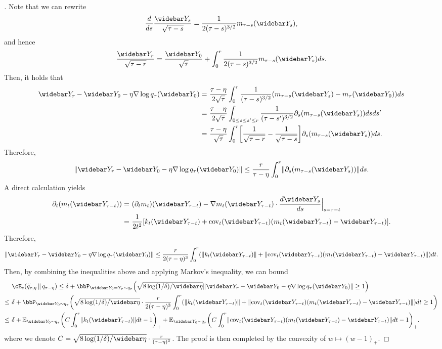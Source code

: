 \begin{proof}[]
Note that we can rewrite
\begin{align*}
    \frac{d}{ds} \frac{\Ybar_s}{\sqrt{\tau-s}}=\frac1{2(\tau-s)^{3/2}}m_{\tau-s}(\Ybar_s),
\end{align*}
and hence
\begin{align*}
    \frac{\Ybar_{r}}{\sqrt{\tau-r}}=\frac{\Ybar_0}{\sqrt{\tau}}+\int_0^r \frac1{2(\tau-s)^{3/2}}m_{\tau-s}(\Ybar_s)ds.
\end{align*}
Then, it holds that
\begin{align*}
    \Ybar_r-\Ybar_0-\eta \nabla \log q_\tau(\Ybar_0)
    =&~\frac{\tau-\eta}{2\sqrt{\tau}}\int_0^r \frac1{(\tau-s)^{3/2}}(m_{\tau-s}(\Ybar_s)-m_\tau(\Ybar_0))ds \\
    =&~\frac{\tau-\eta}{2\sqrt{\tau}}\int_{0\leq s\leq s'\leq r} \frac1{(\tau-s')^{3/2}}\partial_s (m_{\tau-s}(\Ybar_s))dsds' \\
    =&~\frac{\tau-\eta}{\sqrt{\tau}}\int_{0}^r \brk*{\frac{1}{\sqrt{\tau-r}}-\frac{1}{\sqrt{\tau-s}}} \partial_s (m_{\tau-s}(\Ybar_s))ds.
\end{align*}
Therefore,
\begin{align*}
    \nrm{\Ybar_r-\Ybar_0-\eta \nabla \log q_\tau(\Ybar_0)}
    \leq \frac{r}{\tau-\eta}\int_0^r \nrm{\partial_s (m_{\tau-s}(\Ybar_s))} ds.
\end{align*}
A direct calculation yields
\begin{align*}
    \partial_t (m_t(\Ybar_{\tau-t}))
    =&~(\partial_t m_t)(\Ybar_{\tau-t})-\nabla m_t(\Ybar_{\tau-t})\cdot \frac{d\Ybar_s}{ds}\Big|_{s=\tau-t} \\
    =&~ \frac{1}{2t^2}\brk*{ k_t(\Ybar_{\tau-t})+\cov_t(\Ybar_{\tau-t})(m_t(\Ybar_{\tau-t})-\Ybar_{\tau-t}) }.
\end{align*}
Therefore,
\begin{align*}
    \nrm{\Ybar_r-\Ybar_0-\eta \nabla \log q_\tau(\Ybar_0)}
    \leq \frac{r}{2(\tau-\eta)^3}\int_0^r (\nrm{k_t(\Ybar_{\tau-t})}+\nrm{\cov_t(\Ybar_{\tau-t})(m_t(\Ybar_{\tau-t})-\Ybar_{\tau-t})}) dt.
\end{align*}
Then, by combining the inequalities above and applying Markov's inequality, we can bound
\begin{align*}
    &~\Dcov[e]{\wt{q}_{\tau,\eta}}{q_{\tau-\eta}}
    \leq \delta+ \bbP_{\Ybar_0=Y_\tau\sim q_\tau}\prn*{ \sqrt{8\log(1/\delta)/\etabar}\nrm{ \Ybar_r-\Ybar_0-\eta \nabla \log q_\tau(\Ybar_0) }\geq 1 } \\
    \leq&~ \delta+ \bbP_{\Ybar_0\sim q_\tau}\prn*{ \sqrt{8\log(1/\delta)/\etabar}\cdot \frac{r}{2(\tau-\eta)^3}\int_0^r (\nrm{k_t(\Ybar_{\tau-t})}+\nrm{\cov_t(\Ybar_{\tau-t})(m_t(\Ybar_{\tau-t})-\Ybar_{\tau-t})}) dt \geq 1 } \\
    \leq&~ \delta+\En_{\Ybar_0\sim q_\tau}\prn*{C \int_0^r \nrm{k_t(\Ybar_{\tau-t})}dt-1 }_++\En_{\Ybar_0\sim q_\tau}\prn*{C \int_0^r \nrm{\cov_t(\Ybar_{\tau-t})(m_t(\Ybar_{\tau-t})-\Ybar_{\tau-t})}dt-1 }_+.
\end{align*}
where we denote $C=\sqrt{8\log(1/\delta)/\etabar}\cdot \frac{r}{(\tau-\eta)^3}$. The proof is then completed by the convexity of $w\mapsto (w-1)_+$.
\end{proof}




